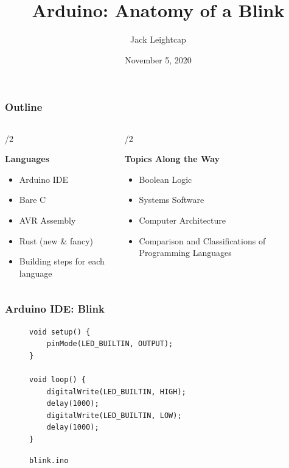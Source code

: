 \documentclass{beamer} \usetheme{Madrid}
\title{Arduino: Anatomy of a Blink}
\author{Jack Leightcap}
\institute[Wireless Club]{
    \url{neuwireless.slack.com}
    \and
    \url{leightcap.j@northeastern.edu}
}
\date[Fall 2020]{November 5, 2020}
\begin{document}
\frame{\titlepage}

\begin{frame}
    \frametitle{Outline}
    \begin{columns}[t]
        \begin{column}{{\textwidth}/2}
            \begin{center}
                \textbf{Languages}
            \end{center}
            \begin{itemize}
                \item Arduino IDE
                \item Bare C
                \item AVR Assembly
                \item Rust (new \& fancy)
                \item Building steps for each language
            \end{itemize}
        \end{column}
        \begin{column}{{\textwidth}/2}
            \begin{center}
                \textbf{Topics Along the Way}
            \end{center}
            \begin{itemize}
                \item Boolean Logic
                \item Systems Software
                \item Computer Architecture
                \item Comparison and Classifications of Programming Languages
            \end{itemize}
        \end{column}
    \end{columns}
\end{frame}

\begin{frame}[fragile]
    \frametitle{Arduino IDE: Blink}
    \begin{figure}
        \begin{verbatim}
void setup() {
    pinMode(LED_BUILTIN, OUTPUT);
}

void loop() {
    digitalWrite(LED_BUILTIN, HIGH);
    delay(1000);
    digitalWrite(LED_BUILTIN, LOW);
    delay(1000);
}
        \end{verbatim}
        \caption{\texttt{blink.ino}}
    \end{figure}
\end{frame}
\end{document}
